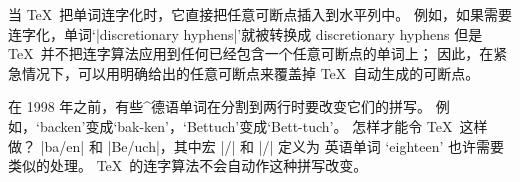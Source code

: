 \danger \1当 \TeX\ 把单词连字化时，它直接把任意可断点插入到水平列中。%
例如，如果需要连字化，单词`|discretionary hyphens|'就被转换成
\begintt
dis\-cre\-tionary hy\-phens
\endtt
但是 \TeX\ 并不把连字算法应用到任何已经包含一个任意可断点的单词上；
因此，在紧急情况下，可以用明确给出的任意可断点来覆盖掉 \TeX\ 自动生成的可断点。

\dangerexercise 在 1998 年之前，有些^{德语}单词在分割到两行时要改变它们的拼写。%
例如，`backen'变成`bak-ken'，`Bettuch'变成`Bett-tuch'。%
怎样才能令 \TeX\ 这样做？
\answer |ba\ck/en| 和 |Be\ttt/uch|，其中宏 |\ck/| 和 |\ttt/| 定义为
\begintt
\def\ck/{\discretionary{k-}{k}{ck}}
\def\ttt/{tt\discretionary{-}{t}{}}
\endtt
英语单词 `eighteen' 也许需要类似的处理。
\TeX\ 的连字算法不会自动作这种拼写改变。

